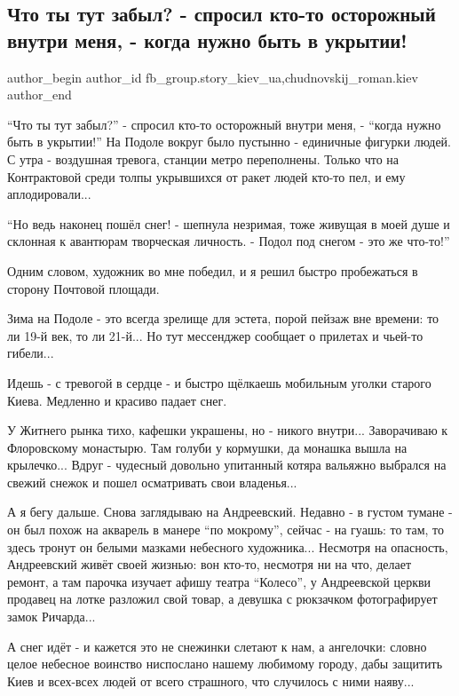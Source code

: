  
 
 
 
 

\subsection{Что ты тут забыл? - спросил кто-то осторожный внутри меня, - когда нужно быть в укрытии!}
\label{sec:26_01_2023.fb.fb_group.story_kiev_ua.1._chto_ti_tut_zabil_}
 
\ifcmt
 author_begin
   author_id fb_group.story_kiev_ua,chudnovskij_roman.kiev
 author_end
\fi

\enquote{Что ты тут забыл?} - спросил кто-то осторожный внутри меня, - \enquote{когда нужно быть
в укрытии!} На Подоле вокруг было пустынно - единичные фигурки людей. С утра -
воздушная тревога, станции метро переполнены. Только что на Контрактовой среди
толпы укрывшихся от ракет людей кто-то пел, и ему аплодировали...

\enquote{Но ведь наконец пошёл снег! - шепнула незримая, тоже живущая в моей душе и
склонная к авантюрам творческая личность. - Подол под снегом - это же что-то!}

Одним словом, художник во мне победил, и я решил быстро пробежаться в сторону
Почтовой площади.

Зима на Подоле - это всегда зрелище для эстета, порой пейзаж вне времени: то ли
19-й век, то ли 21-й... Но тут мессенджер сообщает о прилетах и чьей-то
гибели...

Идешь - с тревогой в  сердце - и быстро щёлкаешь мобильным уголки старого
Киева. Медленно и красиво падает снег.

У Житнего рынка тихо, кафешки украшены, но - никого внутри... Заворачиваю к
Флоровскому монастырю. Там голуби у кормушки, да монашка вышла на крылечко...
Вдруг - чудесный довольно упитанный котяра вальяжно выбрался на свежий снежок и
пошел осматривать свои владенья... 

А я бегу дальше. Снова заглядываю на Андреевский. Недавно - в густом тумане -
он был похож на акварель в манере \enquote{по мокрому}, сейчас - на гуашь: то там, то
здесь тронут он белыми мазками небесного художника... Несмотря на опасность,
Андреевский живёт своей жизнью: вон кто-то, несмотря ни на что, делает ремонт,
а там парочка изучает афишу театра \enquote{Колесо}, у Андреевской церкви продавец на
лотке разложил свой товар, а девушка с рюкзачком фотографирует замок Ричарда...

А снег идёт - и кажется это не снежинки слетают к нам, а ангелочки: словно
целое небесное воинство ниспослано нашему любимому городу, дабы защитить Киев и
всех-всех людей от всего страшного, что случилось с ними наяву...
